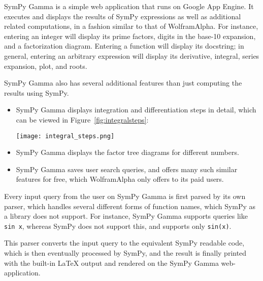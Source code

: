 
SymPy Gamma is a simple web application that runs on Google App Engine.
It executes and displays the results of SymPy expressions as well as
additional related computations, in a fashion similar to that of
Wolfram\textbar{}Alpha. For instance, entering an integer will display
its prime factors, digits in the base-10 expansion, and a factorization
diagram. Entering a function will display its docstring; in general,
entering an arbitrary expression will display its derivative, integral,
series expansion, plot, and roots.

SymPy Gamma also has several additional features than just computing the
results using SymPy.

\begin{itemize}
\item
  SymPy Gamma displays integration and differentiation steps in detail, which
  can be viewed in Figure~\ref{fig:integralsteps}:\par
  {
    \centering
    \texttt{[image: integral\_steps.png]}
    \label{fig:integralsteps}
    \par
  }
\item
  SymPy Gamma displays the factor tree diagrams for different numbers.
\item
  SymPy Gamma saves user search queries, and offers many such similar features
  for free, which Wolfram\textbar{}Alpha only offers to its paid users.
\end{itemize}
Every input query from the user on SymPy Gamma is first parsed by its
own parser, which handles several different forms of function names,
which SymPy as a library does not support. For instance, SymPy Gamma
supports queries like \texttt{sin\ x}, whereas SymPy does not support
this, and supports only \verb|sin(x)|.

This parser converts the input query to the equivalent SymPy readable code,
which is then eventually processed by SymPy, and the result is finally printed
with the built-in LaTeX output and rendered on the SymPy Gamma web-application.
